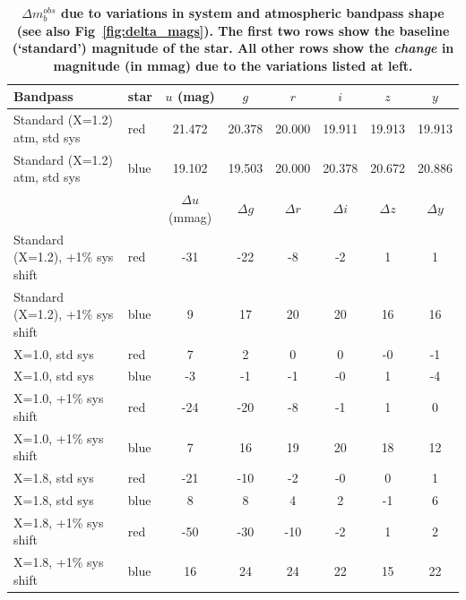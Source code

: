 \documentclass[12pt,preprint]{aastex}
\begin{document}
\begin{center}
\begin{table}[htb]
\caption{{\bf $\Delta m_b^{obs}$ due to variations in system and atmospheric
 bandpass shape (see also Fig~\ref{fig:delta_mags}). The first two
rows show the baseline (`standard') magnitude of the star. All other rows show the 
{\it change} in magnitude (in mmag) due to the variations listed at left. } }
\begin{tabular}{l l | c c c c c c}
Bandpass & star &  $u$ (mag) & $g$ & $r$ & $i$ & $z$ & $y$ \\ \hline
Standard (X=1.2) atm, std sys  &  red & 21.472 & 20.378 & 20.000 & 19.911 & 19.913 & 19.913 \\
Standard (X=1.2) atm, std sys  &  blue & 19.102 & 19.503 & 20.000 & 20.378 & 20.672 & 20.886 \\ \hline \hline
 & & $\Delta u$ (mmag) & $\Delta g$  & $\Delta r$  & $\Delta i$ & $\Delta z$  & $\Delta y$ \\ \hline
Standard (X=1.2), +1\% sys shift & red  & -31 & -22 & -8 & -2 & 1 & 1 \\
Standard (X=1.2), +1\% sys shift & blue  & 9 & 17 & 20 & 20 & 16 & 16 \\ \hline
X=1.0, std sys & red  & 7 & 2 & 0 & 0 & -0 & -1 \\
X=1.0, std sys & blue  & -3 & -1 & -1 & -0 & 1 & -4 \\ \hline
X=1.0, +1\% sys shift & red & -24 & -20 & -8 & -1 & 1 & 0 \\
X=1.0, +1\% sys shift & blue & 7 & 16 & 19 & 20 & 18 & 12 \\ \hline
X=1.8, std sys  & red & -21 & -10 & -2 & -0 & 0 & 1 \\
X=1.8, std sys  & blue & 8 & 8 & 4 & 2 & -1 & 6 \\ \hline
X=1.8, +1\% sys shift & red & -50 & -30 & -10 & -2 & 1 & 2 \\
X=1.8, +1\% sys shift & blue & 16 & 24 & 24 & 22 & 15 & 22 \\ \hline
\end{tabular}
\label{tab:delta_mags}
\end{table}
\end{center}
\end{document}
